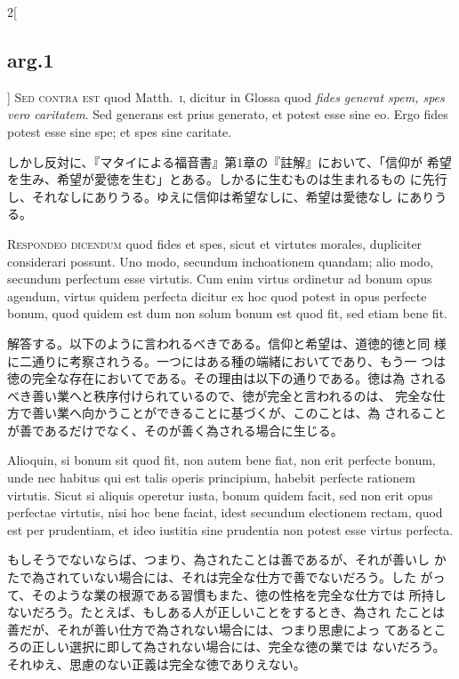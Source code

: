 \documentclass[paper=a4paper,fontsize=10pt,jafontsize=9pt,titlepage]{jlreq}
\begin{document}
\begin{paracol}{2}[\subsection{arg.1}]
{\scshape Sed contra est} quod Matth.~{\scshape i}, dicitur in Glossa
quod {\itshape fides generat spem, spes vero caritatem}. Sed generans
est prius generato, et potest esse sine eo. Ergo fides potest esse
sine spe; et spes sine caritate.

\switchcolumn

しかし反対に、『マタイによる福音書』第1章の『註解』において、「信仰が
 希望を生み、希望が愛徳を生む」とある。しかるに生むものは生まれるもの
 に先行し、それなしにありうる。ゆえに信仰は希望なしに、希望は愛徳なし
 にありうる。


{\scshape Respondeo dicendum} quod fides et spes, sicut et virtutes
 morales, dupliciter considerari possunt. Uno modo, secundum
 inchoationem quandam; alio modo, secundum perfectum esse
 virtutis. Cum enim virtus ordinetur ad bonum opus agendum, virtus
 quidem perfecta dicitur ex hoc quod potest in opus perfecte bonum,
 quod quidem est dum non solum bonum est quod fit, sed etiam bene fit.

\switchcolumn

解答する。以下のように言われるべきである。信仰と希望は、道徳的徳と同
 様に二通りに考察されうる。一つにはある種の端緒においてであり、もう一
 つは徳の完全な存在においてである。その理由は以下の通りである。徳は為
 されるべき善い業へと秩序付けられているので、徳が完全と言われるのは、
 完全な仕方で善い業へ向かうことができることに基づくが、このことは、為
 されることが善であるだけでなく、そのが善く為される場合に生じる。

\switchcolumn*

Alioquin, si bonum sit quod fit, non autem bene fiat, non erit
 perfecte bonum, unde nec habitus qui est talis operis principium,
 habebit perfecte rationem virtutis. Sicut si aliquis operetur iusta,
 bonum quidem facit, sed non erit opus perfectae virtutis, nisi hoc
 bene faciat, idest secundum electionem rectam, quod est per
 prudentiam, et ideo iustitia sine prudentia non potest esse virtus
 perfecta.

\switchcolumn

もしそうでないならば、つまり、為されたことは善であるが、それが善いし
 かたで為されていない場合には、それは完全な仕方で善でないだろう。した
 がって、そのような業の根源である習慣もまた、徳の性格を完全な仕方では
 所持しないだろう。たとえば、もしある人が正しいことをするとき、為され
 たことは善だが、それが善い仕方で為されない場合には、つまり思慮によっ
 てあるところの正しい選択に即して為されない場合には、完全な徳の業では
 ないだろう。それゆえ、思慮のない正義は完全な徳でありえない。


\end{paracol}
\end{document}
